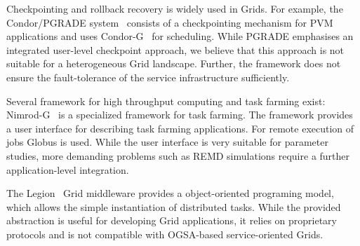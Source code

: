 \documentclass[times, 10pt,twocolumn]{article}
\newcommand{\alnote}[1]{ {\textcolor{blue} { ***AL: #1 }}}
\newcommand{\alnote}[1]{}
\begin{document}
%                                                                                  
%                                                 
                                             
     


Checkpointing and rollback recovery is widely used in Grids. For
example, the Condor/PGRADE system~\cite{DBLP:conf/eagc/KovacsK04}
consists of a checkpointing mechanism for PVM applications and uses
Condor-G~\cite{citeulike:291860} for scheduling.  While PGRADE
emphasises an integrated user-level checkpoint approach, we believe
that this approach is not suitable for a heterogeneous Grid
landscape. Further, the framework does not ensure the fault-tolerance
of the service infrastructure sufficiently.
                                 
Several framework for high throughput computing and task farming exist:
Nimrod-G~\cite{buyya00nimrodg} is a specialized framework for task
farming. The framework provides a user interface for describing task
farming applications. For remote execution of jobs Globus is
used. While the user interface is very suitable for parameter studies,
more demanding problems such as REMD simulations require a further
application-level integration.

The Legion~\cite{689541} Grid middleware provides a object-oriented
programing model, which allows the simple instantiation of distributed
tasks. While the provided abstraction is useful for developing Grid
applications, it relies on proprietary protocols and is not compatible
with OGSA-based service-oriented Grids.
\end{document}
